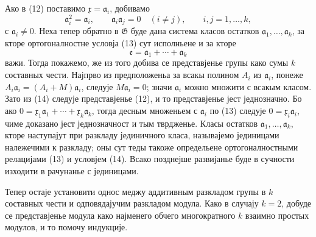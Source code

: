 ﻿\documentclass[11pt]{article}
\providecommand{\mG}{\mathfrak G}
\providecommand{\ma}{\mathfrak a}
\providecommand{\me}{\mathfrak e}
\providecommand{\mx}{\mathfrak x}
\begin{document}
Ако в (12) поставимо \(\mx=\ma_i\), добивамо
\begin{equation}
 \ma_i^2=\ma_i,
 \qquad \ma_i\ma_j=0\quad(i\ne j),
 \qquad i,j=1,\ldots,k,
\tag{13}
\end{equation}
с \(\ma_i\ne0\). Неха тепер обратно в \(\mG\) буде дана система класов остатков \(\ma_1,\ldots,\ma_k\), за кторе ортогоналностне условја (13) сут исполньене и за кторе
\begin{equation}
 \me=\ma_1+\cdots+\ma_k
\tag{14}
\end{equation}
важи. Тогда покажемо, же из того добива се представјенье групы како сумы \(k\) составных чести. Најпрво из предположеньа за всакы полином \(A_i\) из \(\ma_i\), понеже \(A_i\ma_i=(A_i+M)\ma_i\), следује \(M\ma_i=0\); значи \(\ma_i\) можно множити с всакым класом. Зато из (14) следује представјенье (12), и то представјенье јест једнозначно. Бо ако \(0=\mx_1\ma_1+\cdots+\mx_k\ma_k\), тогда десным множеньем с \(\ma_i\) по (13) следује \(0=\mx_i\ma_i\), чиме доказано јест једнозначност и тым тврдженье. Класы остатков \(\ma_1,\ldots,\ma_k\), кторе наступајут при разкладу јединичного класа, называјемо јединицами належечими к разкладу; оны сут теды такоже определьене ортогоналностными релацијами (13) и условјем (14). Всако позднејше развијанье буде в сучности изходити в рачунанье с јединицами.

Тепер остаје установити однос меджу аддитивным разкладом групы в \(k\) составных чести и одповядајучим разкладом модула. Како в случају \(k=2\), добуде се представјенье модула како најменего обчего многократного \(k\) взаимно простых модулов, и то помочу индукције.
\end{document}
